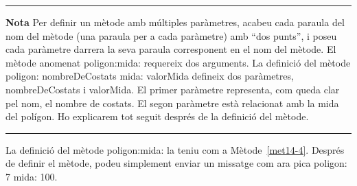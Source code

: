 \vspace*{1mm}
\noindent
\rule{\textwidth}{2pt}
\noindent
\textbf{Nota} Per definir un mètode amb múltiples paràmetres, acabeu cada paraula del nom del mètode (una paraula per a cada paràmetre) amb ``dos punts'', i poseu cada paràmetre darrera la seva paraula corresponent en el nom del mètode. El mètode anomenat \textsf{poligon:mida:} requereix dos arguments. La definició del mètode \textsf{poligon: nombreDeCostats mida: valorMida} defineix dos paràmetres, \textsf{nombreDeCostats} i \textsf{valorMida}. El primer paràmetre representa, com queda clar pel nom, el nombre de costats. El segon paràmetre està relacionat amb la mida del polígon. Ho explicarem tot seguit després de la definició del mètode.
\\
\noindent
\rule{\textwidth}{2pt}
\vspace*{1mm}

La definició del mètode \textsf{poligon:mida:} la teniu com a Mètode~\ref{met14-4}. Després de definir el mètode, podeu simplement enviar un missatge com ara \textsf{pica poligon: 7 mida: 100}. 

\newpage


